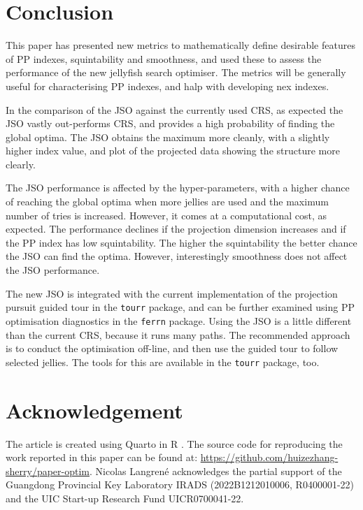 \documentclass[
  number,
  preprint,
  3p]{elsarticle}
\begin{document}
\section{Conclusion}\label{sec-conclusion}

This paper has presented new metrics to mathematically define desirable
features of PP indexes, squintability and smoothness, and used these to
assess the performance of the new jellyfish search optimiser. The
metrics will be generally useful for characterising PP indexes, and halp
with developing nex indexes.

In the comparison of the JSO against the currently used CRS, as expected
the JSO vastly out-performs CRS, and provides a high probability of
finding the global optima. The JSO obtains the maximum more cleanly,
with a slightly higher index value, and plot of the projected data
showing the structure more clearly.

The JSO performance is affected by the hyper-parameters, with a higher
chance of reaching the global optima when more jellies are used and the
maximum number of tries is increased. However, it comes at a
computational cost, as expected. The performance declines if the
projection dimension increases and if the PP index has low
squintability. The higher the squintability the better chance the JSO
can find the optima. However, interestingly smoothness does not affect
the JSO performance.

The new JSO is integrated with the current implementation of the
projection pursuit guided tour in the \texttt{tourr} package, and can be
further examined using PP optimisation diagnostics in the \texttt{ferrn}
package. Using the JSO is a little different than the current CRS,
because it runs many paths. The recommended approach is to conduct the
optimisation off-line, and then use the guided tour to follow selected
jellies. The tools for this are available in the \texttt{tourr} package,
too.

\section{Acknowledgement}\label{acknowledgement}

The article is created using Quarto \citep{Allaire_Quarto_2022} in R
\citep{R}. The source code for reproducing the work reported in this
paper can be found at:
\url{https://github.com/huizezhang-sherry/paper-optim}. Nicolas Langrené
acknowledges the partial support of the Guangdong Provincial Key
Laboratory IRADS (2022B1212010006, R0400001-22) and the UIC Start-up
Research Fund UICR0700041-22.


\renewcommand\refname{References}
  
\end{document}
